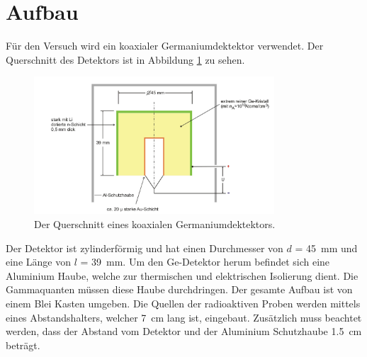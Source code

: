 \section{Aufbau}
\label{sec:Aufbau}

Für den Versuch wird ein koaxialer Germaniumdektektor verwendet. Der Querschnitt des Detektors ist in Abbildung \ref{fig:aufbau} zu sehen.

\begin{figure}[H]
    \centering
    \includegraphics[width=0.8\textwidth]{content/grafik/aufbau.jpg}
    \caption{Der Querschnitt eines koaxialen Germaniumdektektors. \cite{germanium}}
    \label{fig:aufbau}
\end{figure}

Der Detektor ist zylinderförmig und hat einen Durchmesser von $d$ = \qty{45}{\milli\meter} und eine Länge von $l$ = \qty{39}{\milli\meter}.
Um den Ge-Detektor herum befindet sich eine Aluminium Haube, welche zur thermischen und 
elektrischen Isolierung dient. Die Gammaquanten müssen diese Haube durchdringen.
Der gesamte Aufbau ist von einem Blei Kasten umgeben.
Die Quellen der radioaktiven Proben werden mittels eines Abstandshalters, welcher \qty{7}{\centi\meter} lang ist, eingebaut.
Zusätzlich muss beachtet werden, dass der Abstand vom Detektor und der Aluminium
Schutzhaube \qty{1.5}{\centi\meter} beträgt.

